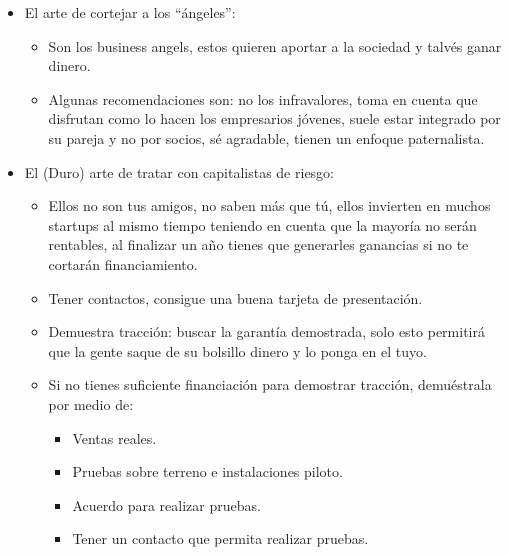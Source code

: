 \documentclass{article}
\begin{document}
\begin{itemize}
    \item El arte de cortejar a los ``ángeles'':
        \begin{itemize}
            \item Son los business angels, estos quieren aportar a la sociedad y talvés ganar dinero.
            \item Algunas recomendaciones son: no los infravalores, toma en cuenta que disfrutan como lo hacen los empresarios jóvenes, suele estar integrado por su pareja y no por socios, sé agradable, tienen un enfoque paternalista. 
        \end{itemize}
    
    \item El (Duro) arte de tratar con capitalistas de riesgo:
        \begin{itemize}
            \item Ellos no son tus amigos, no saben más que tú, ellos invierten en muchos startups al mismo tiempo teniendo en cuenta que la mayoría no serán rentables, al finalizar un año tienes que generarles ganancias si no te cortarán financiamiento.
            \item Tener contactos, consigue una buena tarjeta de presentación.
            \item Demuestra tracción: buscar la garantía demostrada, solo esto permitirá que la gente saque de su bolsillo dinero y lo ponga en el tuyo.
            \item Si no tienes suficiente financiación para demostrar tracción, demuéstrala por medio de:
                \begin{itemize}
                    \item Ventas reales.
                    \item Pruebas sobre terreno e instalaciones piloto.
                    \item Acuerdo para realizar pruebas.
                    \item Tener un contacto que permita realizar pruebas.
                \end{itemize}
            

\end{itemize}
\end{itemize}
\end{document}
